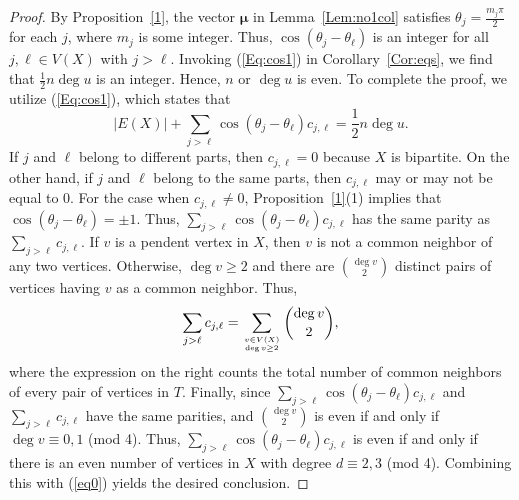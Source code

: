 \documentclass[10pt,a4paper]{amsart}
\newcommand{\bmu}{{\boldsymbol{\mu}}}
\begin{document}
\begin{proof}
By Proposition~\ref{1}, the vector $\bmu$ in Lemma~\ref{Lem:no1col} satisfies $\theta_j=\frac{m_j\pi}{2}$ for each $j$, where $m_j$ is some integer. Thus, $\cos(\theta_j-\theta_{\ell})$ is an integer for all $j,\ell\in V(X)$ with $j>\ell$. Invoking (\ref{Eq:cos1}) in Corollary~\ref{Cor:eqs}, we find that $\frac{1}{2}n\operatorname{deg}u$ is an integer. Hence, $n$ or $\operatorname{deg}u$ is even. To complete the proof, we utilize (\ref{Eq:cos1}), which states that
\begin{equation}
\label{eq0}
|E(X)|+\sum_{j>\ell}\cos(\theta_j-\theta_{\ell})c_{j,\ell}=\frac{1}{2}n\operatorname{deg}u.
\end{equation}
If $j$ and $\ell$ belong to different parts, then $c_{j,\ell}=0$ because $X$ is bipartite. On the other hand, if $j$ and $\ell$ belong to the same parts, then $c_{j,\ell}$ may or may not be equal to 0. For the case when $c_{j,\ell}\neq 0$, Proposition~\ref{1}(1) implies that $\cos(\theta_j-\theta_{\ell})=\pm 1$. Thus, $\sum_{j>\ell}\cos(\theta_j-\theta_{\ell})c_{j,\ell}$ has the same parity as $\sum_{j>\ell}c_{j,\ell}$. 
If $v$ is a pendent vertex in $X$, then $v$ is not a common neighbor of any two vertices. Otherwise, $\operatorname{deg}v\geq 2$ and there are ${\operatorname{deg}v\choose 2}$ distinct pairs of vertices having $v$ as a common neighbor. Thus, 
\begin{equation}
\label{q}
\sum_{j>\ell}c_{j,\ell}=\sum_{{v\in V(X)}\atop{\operatorname{deg}v\geq 2}}{\operatorname{deg}v\choose 2},
\end{equation}
where the expression on the right counts the total number of common neighbors of every pair of vertices in $T$. Finally, since $\sum_{j>\ell}\cos(\theta_j-\theta_{\ell})c_{j,\ell}$ and $\sum_{j>\ell}c_{j,\ell}$ have the same parities, and ${\operatorname{deg}v\choose 2}$ is even if and only if $\operatorname{deg}v\equiv 0,1$ (mod 4). Thus, $\sum_{j>\ell}\cos(\theta_j-\theta_{\ell})c_{j,\ell}$ is even if and only if there is an even number of vertices in $X$ with degree $d\equiv 2,3$ (mod 4). Combining this with (\ref{eq0}) yields the desired conclusion.
\end{proof}
\end{document}
